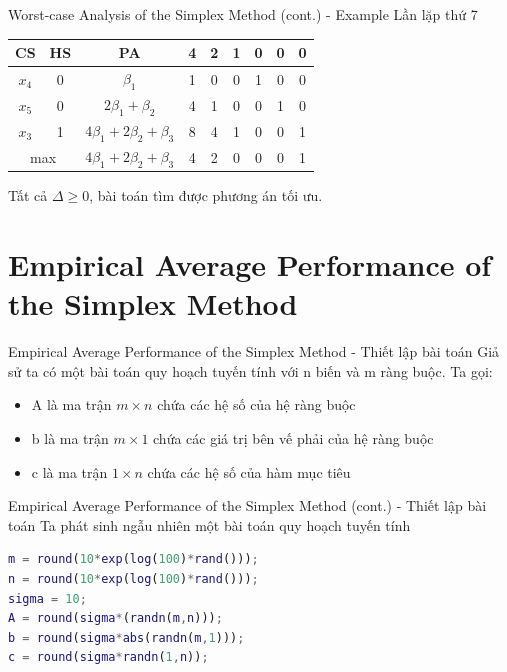 \documentclass[10pt]{beamer}
\begin{document}
\begin{frame}{Worst-case Analysis of the Simplex Method (cont.) - Example}
Lần lặp thứ 7
\begin{table}[H]
\centering
\begin{tabular}{|c|c|c|c|c|c|c|c|c|}
\hline
CS & HS & PA & 4 & 2 & 1 & 0 & 0 & 0 \\
\hline
$x_4$ & 0 & $\beta_1$ & 1 & 0 & 0 & 1 & 0 & 0 \\
$x_5$ & 0 & $2\beta_1 + \beta_2$ & 4 & 1 & 0 & 0 & 1 & 0 \\
$x_3$ & 1 & $4\beta_1 + 2\beta_2 + \beta_3$ & 8 & 4 & 1 & 0 & 0 & 1 \\
\hline
\multicolumn{2}{|c|}{max}
&  $4\beta_1 + 2\beta_2 + \beta_3$  & 4 & 2 & 0 & 0 & 0 & 1 \\
\hline
\end{tabular}
\end{table}
Tất cả $\Delta \ge 0$, bài toán tìm được phương án tối ưu.
\end{frame}


\section{Empirical Average Performance of the Simplex Method}
\begin{frame}{Empirical Average Performance of the Simplex Method - Thiết lập bài toán}
Giả sử ta có một bài toán quy hoạch tuyến tính với n biến và m ràng buộc. Ta gọi:
\begin{itemize}
\item A là ma trận $m\times n$ chứa các hệ số của hệ ràng buộc
\item b là ma trận $m\times 1$ chứa các giá trị bên vế phải của hệ ràng buộc
\item c là ma trận $1\times n$ chứa các hệ số của hàm mục tiêu
\end{itemize}
\end{frame}

\begin{frame}[fragile]{Empirical Average Performance of the Simplex Method (cont.) - Thiết lập bài toán}
Ta phát sinh ngẫu nhiên một bài toán quy hoạch tuyến tính
\begin{lstlisting}[language=Matlab]
m = round(10*exp(log(100)*rand()));
n = round(10*exp(log(100)*rand()));
sigma = 10;
A = round(sigma*(randn(m,n)));
b = round(sigma*abs(randn(m,1)));
c = round(sigma*randn(1,n));
\end{lstlisting}
\end{frame}
\end{document}
